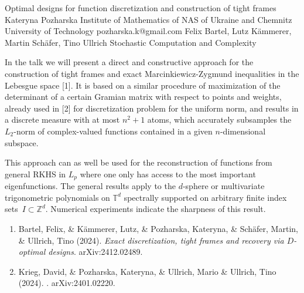 \begin{talk}
  {Optimal designs for function discretization and construction of tight frames}%
  {Kateryna Pozharska}%
  {Institute of Mathematics of NAS of Ukraine and Chemnitz University of Technology}%
  {pozharska.k@gmail.com}%
  {Felix Bartel,  Lutz K\"ammerer,  Martin Sch\"afer, Tino Ullrich}%
  {Stochastic Computation and Complexity}%
    


In the talk we will present a direct and constructive approach for the construction of tight frames and exact Marcinkiewicz-Zygmund inequalities in the Lebesgue space [1]. 
It is based on a similar procedure of maximization of the determinant of a certain Gramian matrix with respect to points and weights, already used in [2] for discretization problem for the uniform norm, and results in a discrete measure  with at most $n^2+1$ atoms, which accurately subsamples the $L_2$-norm of complex-valued functions contained in a  given $n$-dimensional subspace.

This approach can as well be used for the reconstruction of functions from general RKHS in $L_p$ where one only has access to the most important eigenfunctions. The general results apply to the $d$-sphere or multivariate trigonometric polynomials on $\mathbb{T}^d$ spectrally supported on arbitrary finite index sets~$I \subset \mathbb{Z}^d$.  Numerical experiments indicate the sharpness of this result. 


\begin{enumerate}
 \item[{[1]}]  Bartel, Felix,  \& K\"ammerer, Lutz,  \& Pozharska,  Kateryna, \& Sch\"afer, Martin,  \& \newline Ullrich, Tino (2024). {\it Exact discretization, tight frames and recovery via $D$-optimal designs}. arXiv:2412.02489.
    
 \item[{[2]}] Krieg, David, \&  Pozharska, Kateryna, \& Ullrich, Mario \&  Ullrich, Tino (2024). . arXiv:2401.02220.

\end{enumerate}


\end{talk}


